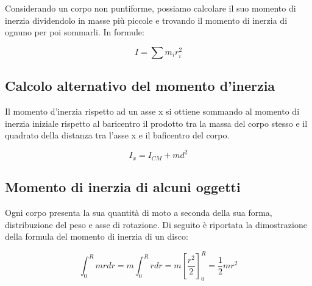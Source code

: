 \documentclass[10pt,a4paper]{article}
\begin{document}
	Considerando un corpo non puntiforme, possiamo calcolare il suo momento di inerzia dividendolo in masse più piccole e trovando il momento di inerzia di ognuno per poi sommarli. In formule:

	\begin{definition}
		\begin{equation}
			I = \sum m_i r_i^2
		\end{equation}
	\end{definition}

	\subsection{Calcolo alternativo del momento d'inerzia}

	Il momento d'inerzia rispetto ad un asse x si ottiene sommando al momento di inerzia iniziale rispetto al baricentro il prodotto tra la massa del corpo stesso e il quadrato della distanza tra l'asse x e il baficentro del corpo.

	\begin{definition}
		\begin{equation}
		I_x = I_{CM} + md^2
		\end{equation}
	\end{definition}

	\subsection{Momento di inerzia di alcuni oggetti}

	Ogni corpo presenta la sua quantità di moto a seconda della sua forma, distribuzione del peso e asse di rotazione. Di seguito è riportata la dimostrazione della formula del momento di inerzia di un disco:

	\begin{equation}
		\int_{0}^{R} mr dr = m \int_{0}^{R} r dr = m [\frac{r^2}{2}]_0^R = \frac{1}{2}mr^2
	\end{equation}
\end{document}
